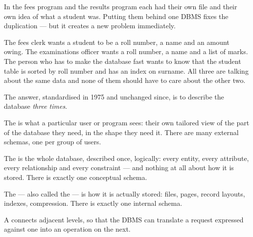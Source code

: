 In  the fees program and the results program each had their
own file and their own idea of what a student was. Putting them behind one
DBMS fixes the duplication --- but it creates a new problem immediately.

The fees clerk wants a student to be a roll number, a name and an amount
owing. The examinations officer wants a roll number, a name and a list of
marks. The person who has to make the database fast wants to know that the
student table is sorted by roll number and has an index on surname. All three
are talking about the same data and none of them should have to care about the
other two.

The answer, standardised in 1975 and unchanged since, is to describe the
database \emph{three times}.

\begin{definitionbox}
The  is what a particular user or program sees: their own
tailored view of the part of the database they need, in the shape they need
it. There are many external schemas, one per group of users.

\smallskip
The  is the whole database, described once, logically:
every entity, every attribute, every relationship and every constraint ---
and nothing at all about how it is stored. There is exactly one conceptual
schema.

\smallskip
The  --- also called the  --- is how it is actually stored: files, pages, record
layouts, indexes, compression. There is exactly one internal schema.

\smallskip
A  connects adjacent levels, so that the DBMS can translate a
request expressed against one into an operation on the next.
\end{definitionbox}

